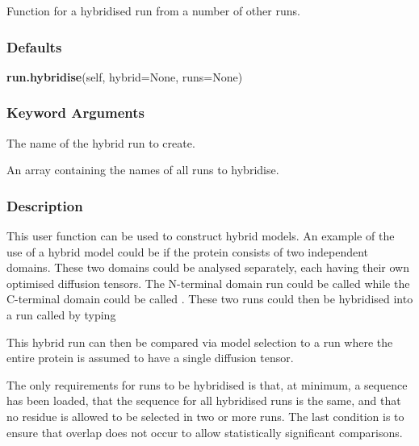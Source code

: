  Function for a hybridised run from a number of other runs. 
  

  
 \subsubsection{Defaults} 

 \textsf{\textbf{run.hybridise}(self, hybrid=None, runs=None)} 

  
 \subsubsection{Keyword Arguments} 

   The name of the hybrid run to create.   

   An array containing the names of all runs to hybridise.  

  

  
 \subsubsection{Description} 

 This user function can be used to construct hybrid models.  An example of the use of a hybrid model could be if the protein consists of two independent domains.  These two domains could be analysed separately, each having their own optimised diffusion tensors.  The N-terminal domain run could be called  while the C-terminal domain could be called .  These two runs could then be hybridised into a run called  by typing 
  



 This hybrid run can then be compared via model selection to a run where the entire protein is assumed to have a single diffusion tensor. 
  

 The only requirements for runs to be hybridised is that, at minimum, a sequence has been loaded, that the sequence for all hybridised runs is the same, and that no residue is allowed to be selected in two or more runs.  The last condition is to ensure that overlap does not occur to allow statistically significant comparisons. 
  

